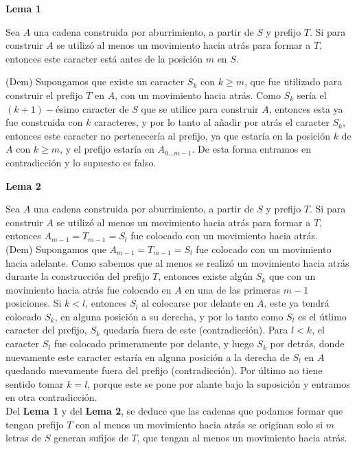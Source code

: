 \documentclass[a4paper]{article}
\begin{document}
    \textbf{Lema 1}
    
    Sea $A$ una cadena construida por aburrimiento, a partir de $S$ y prefijo $T$. Si para construir $A$ se utiliz\'o al menos un movimiento hacia atr\'as para formar a $T$, entonces este caracter está antes de la posición $m$ en $S$.
    
    (Dem) Supongamos que existe un caracter $S_k$ con $k \ge m$, que fue utilizado para construir el prefijo $T$ en $A$, con un movimiento hacia atrás. Como $S_k$ sería el $(k+1)-$ésimo caracter de $S$ que se utilice para construir $A$, entonces esta ya fue construida con $k$ caracteres, y por lo tanto al añadir por atrás el caracter $S_k$, entonces este caracter no pertenecería al prefijo, ya que estaría en la posición $k$ de $A$ con $k \ge m$, y el prefijo estaría en $A_{0...m-1}$. De esta forma entramos en contradicción y lo supuesto es falso.	
    
    \textbf{Lema 2}
    
    Sea $A$ una cadena construida por aburrimiento, a partir de $S$ y prefijo $T$.
    Si para construir $A$ se utiliz\'o al menos un movimiento hacia atr\'as para formar a $T$,
    entonces $A_{m-1} = T_{m-1} = S_{l}$ fue colocado con un movimiento hacia atr\'as. \\
    
    (Dem) Supongamos que $A_{m-1} = T_{m-1} = S_{l}$ fue colocado con un movimiento hacia adelante.
    Como sabemos que al menos se realiz\'o un movimiento hacia atr\'as durante la construcci\'on
    del prefijo $T$, entonces existe alg\'un $S_{k}$ que con un movimiento hacia atr\'as fue colocado
    en $A$ en una de las primeras $m-1$ posiciones. Si $k<l$, entonces $S_l$ al colocarse por delante
    en $A$, este ya tendr\'a colocado $S_k$, en alguna posici\'on a su derecha, y por lo tanto
    como $S_l$ es el \'utlimo caracter del prefijo, $S_k$ quedar\'ia fuera de este (contradicci\'on).
    Para $l<k$, el caracter $S_l$ fue colocado primeramente por delante, y luego $S_k$ por detr\'as,
    donde nuevamente este caracter estar\'ia en alguna posici\'on a la derecha de $S_l$ en $A$
    quedando nuevamente fuera del prefijo (contradicci\'on).
    Por \'ultimo no tiene sentido tomar $k=l$, porque este se pone por alante bajo la suposici\'on
    y entramos en otra contradicci\'on.\\
        
    
    Del \textbf{Lema 1} y del \textbf{Lema 2}, se deduce que las cadenas que podamos formar que tengan prefijo $T$ con al menos un 
    movimiento hacia atr\'as se originan solo si $m$ letras de $S$ generan sufijos de $T$, que tengan al menos un movimiento hacia atr\'as. \\
    
\end{document}
